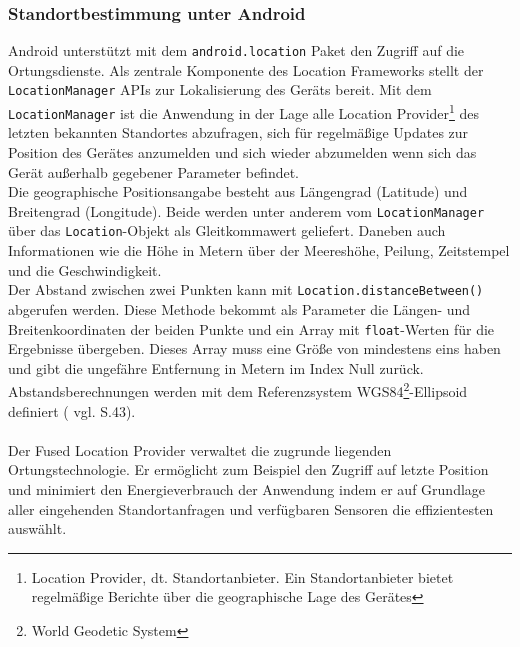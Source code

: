 \subsubsection{Standortbestimmung unter Android}
Android unterstützt mit dem \texttt{android.location} Paket den Zugriff auf die Ortungsdienste. Als zentrale Komponente des Location Frameworks stellt der \texttt{LocationManager} \glspl{API} zur Lokalisierung des Geräts bereit. Mit dem \texttt{LocationManager} ist die Anwendung in der Lage alle Location Provider\footnote{ Location Provider, dt. Standortanbieter. Ein Standortanbieter bietet regelmäßige Berichte über die geographische Lage des Gerätes} des letzten bekannten Standortes abzufragen, sich für regelmäßige Updates zur Position des Gerätes anzumelden und sich wieder abzumelden wenn sich das Gerät außerhalb gegebener Parameter befindet. \cite{android_gps} \\
Die geographische Positionsangabe besteht aus Längengrad (Latitude) und Breitengrad (Longitude). Beide werden unter anderem vom \texttt{LocationManager} über das \texttt{Location}-Objekt als Gleitkommawert geliefert. Daneben auch Informationen wie die Höhe in Metern über der Meereshöhe, Peilung, Zeitstempel und die Geschwindigkeit.\\
Der Abstand zwischen zwei Punkten kann mit \texttt{Location.distanceBetween()} abgerufen werden. Diese Methode bekommt als Parameter die Längen- und Breitenkoordinaten der beiden Punkte und ein Array mit \texttt{float}-Werten für die Ergebnisse übergeben. Dieses Array muss eine Größe von mindestens eins haben und gibt die ungefähre Entfernung in Metern im Index Null zurück. Abstandsberechnungen werden mit dem Referenzsystem WGS84\footnote{ World Geodetic System}-Ellipsoid definiert ( vgl. \cite{location} S.43). 
\\\\
Der Fused Location Provider verwaltet die zugrunde liegenden Ortungstechnologie. Er ermöglicht zum Beispiel den Zugriff auf letzte Position und minimiert den Energieverbrauch der Anwendung indem er auf Grundlage aller eingehenden Standortanfragen und verfügbaren Sensoren die effizientesten auswählt. \cite{android_fused}
\clearpage

